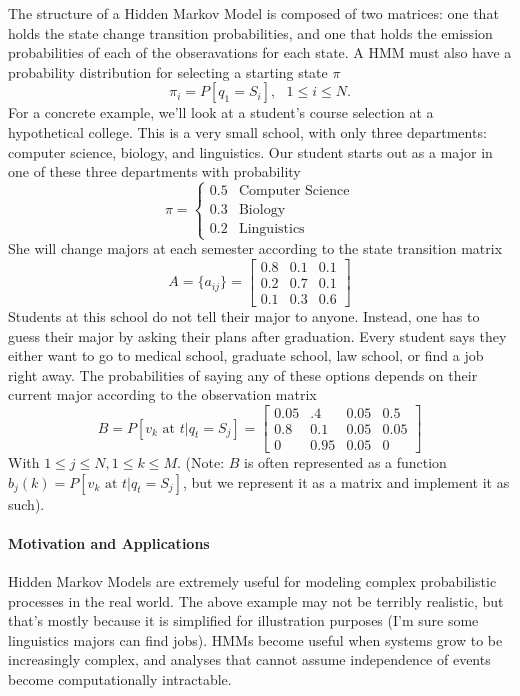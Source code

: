 The structure of a Hidden Markov Model is composed of two matrices: one that holds the state change transition probabilities, and one that holds the emission probabilities of each of the obseravations for each state. A HMM must also have a probability distribution for selecting a starting state $\pi$ \[
  \pi_i = P[q_1 = S_i], \ \ \ 1 \leq i \leq N.
\] For a concrete example, we'll look at a student's course selection at a hypothetical college. This is a very small school, with only three departments: computer science, biology, and linguistics. Our student starts out as a major in one of these three departments with probability \[
  \pi = \begin{cases} 
            0.5 & \text{Computer Science}\\
            0.3 & \text{Biology}\\
            0.2 & \text{Linguistics}
          \end{cases}
\] She will change majors at each semester according to the state transition matrix \[
  A = \{a_{ij}\} = \begin{bmatrix}
                      0.8 & 0.1 & 0.1\\
                      0.2 & 0.7 & 0.1\\
                      0.1 & 0.3 & 0.6
                    \end{bmatrix}
\] Students at this school do not tell their major to anyone. Instead, one has to guess their major by asking their plans after graduation. Every student says they either want to go to medical school, graduate school, law school, or find a job right away. The probabilities of saying any of these options depends on their current major according to the observation matrix \[
  B = P[v_k \text{ at } t|q_t = S_j] = \begin{bmatrix}
                                        0.05 & .4 & 0.05 & 0.5\\
                                        0.8 & 0.1 & 0.05 & 0.05\\
                                        0 & 0.95 & 0.05 & 0
                                      \end{bmatrix}
\] With $1 \leq j \leq N, 1 \leq k \leq M$. (Note: $B$ is often represented as a function $b_j(k) = P[v_k \text{ at } t|q_t = S_j]$, but we represent it as a matrix and implement it as such). 



\paragraph{Motivation and Applications}
Hidden Markov Models are extremely useful for modeling complex probabilistic processes in the real world. The above example may not be terribly realistic, but that's mostly because it is simplified for illustration purposes (I'm sure some linguistics majors can find jobs). HMMs become useful when systems grow to be increasingly complex, and analyses that cannot assume independence of events become computationally intractable. 

